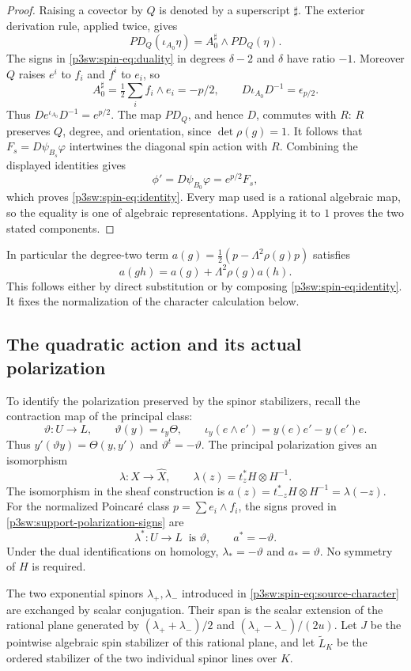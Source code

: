 \documentclass[11pt]{article}
\numberwithin{equation}{section}
\begin{document}
\begin{proof}
Raising a covector by \(Q\) is denoted by a superscript \(\sharp\).
The exterior derivation rule, applied twice, gives
\[
 PD_Q(\iota_{A_0}\eta)=A_0^\sharp\wedge PD_Q(\eta).
\]
The signs in \eqref{p3sw:spin-eq:duality} in degrees
\(\delta-2\) and \(\delta\) have ratio \(-1\).  Moreover \(Q\) raises
\(e^i\) to \(f_i\) and \(f^i\) to \(e_i\), so
\[
 A_0^\sharp=\tfrac12\sum_i f_i\wedge e_i=-p/2,\qquad
 D\iota_{A_0}D^{-1}=\epsilon_{p/2}.
\]
Thus \(De^{\iota_{A_0}}D^{-1}=e^{p/2}\).
The map \(PD_Q\), and hence \(D\), commutes with \(R\): \(R\)
preserves \(Q\), degree, and orientation, since \(\det\rho(g)=1\).
It follows that \(F_s=D\psi_{B_s}\varphi\) intertwines the diagonal
spin action with \(R\).  Combining the displayed identities gives
\[
 \phi'=D\psi_{B_0}\varphi=e^{p/2}F_s,
\]
which proves \eqref{p3sw:spin-eq:identity}.  Every map used is a
rational algebraic map, so the equality is one of algebraic
representations.  Applying it to \(1\) proves the two stated
components.
\end{proof}

In particular the degree-two term
\(a(g)=\frac12(p-\Lambda^2\rho(g)p)\) satisfies
\[
 a(gh)=a(g)+\Lambda^2\rho(g)a(h).
\]
This follows either by direct substitution or by composing
\eqref{p3sw:spin-eq:identity}.  It fixes the normalization of the
character calculation below.

\subsection{The quadratic action and its actual polarization}

To identify the polarization preserved by the spinor stabilizers,
recall the contraction map of the principal class:
\[
 \vartheta:U\longrightarrow L,\qquad
 \vartheta(y)=\iota_y\Theta,\qquad
 \iota_y(e\wedge e')=y(e)e'-y(e')e.
\]
Thus \(y'(\vartheta y)=\Theta(y,y')\) and
\(\vartheta^t=-\vartheta\).  The principal polarization gives an
isomorphism
\[
 \lambda:X\longrightarrow\widehat X,\qquad
 \lambda(z)=t_z^*H\otimes H^{-1}.
\]
The isomorphism in the sheaf construction is
\(a(z)=t_{-z}^*H\otimes H^{-1}=\lambda(-z)\).
For the normalized Poincar\'e class \(p=\sum e_i\wedge f_i\),
the signs proved in \eqref{p3sw:support-polarization-signs} are
\[
 \lambda^*:U\longrightarrow L\ \text{ is }\vartheta,\qquad
 a^*=-\vartheta.
\]
Under the dual identifications on homology,
\(\lambda_*=-\vartheta\) and \(a_*=\vartheta\).
No symmetry of \(H\) is required.

The two exponential spinors \(\lambda_+,\lambda_-\) introduced in
\eqref{p3sw:spin-eq:source-character} are exchanged by scalar
conjugation.  Their span is the scalar extension of the rational
plane generated by
\((\lambda_++\lambda_-)/2\) and
\((\lambda_+-\lambda_-)/(2u)\).  Let \(J\) be the pointwise algebraic
spin stabilizer of this rational plane, and let
\(\widetilde L_K\) be the ordered stabilizer of the two individual
spinor lines over \(K\).
\end{document}
